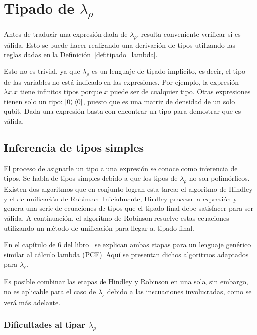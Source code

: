 \chapter{\texorpdfstring{Tipado de $\lambda_\rho$}{Tipado de Lambda Rho}}\label{ch:tipado}

Antes de traducir una expresión dada de $\lambda_\rho$, resulta conveniente verificar si es válida. Esto se puede hacer realizando una derivación de tipos utilizando las reglas dadas en la Definición~\ref{def:tipado_lambda}.

Esto no es trivial, ya que $\lambda_\rho$ es un lenguaje de tipado implícito, es decir, el tipo de las variables no está indicado en las expresiones. Por ejemplo, la expresión $\lambda x.x$ tiene infinitos tipos porque $x$ puede ser de cualquier tipo. Otras expresiones tienen solo un tipo: $\ket{0}\bra{0}$, puesto que es una matriz de densidad de un solo qubit. Dada una expresión basta con encontrar un tipo para demostrar que es válida.

\section{Inferencia de tipos simples}

El proceso de asignarle un tipo a una expresión se conoce como inferencia de tipos. Se habla de tipos simples debido a que los tipos de $\lambda_\rho$ no son polimórficos. Existen dos algoritmos que en conjunto logran esta tarea: el algoritmo de Hindley y el de unificación de Robinson. Inicialmente, Hindley procesa la expresión y genera una serie de ecuaciones de tipos que el tipado final debe satisfacer para ser válida. A continuación, el algoritmo de Robinson resuelve estas ecuaciones utilizando un método de unificación para llegar al tipado final.

En el capítulo de 6 del libro~\cite{intro_programming_languages} se explican ambas etapas para un lenguaje genérico similar al cálculo lambda (PCF). Aquí se presentan dichos algoritmos adaptados para $\lambda_\rho$.

\begin{observacion}
Es posible combinar las etapas de Hindley y Robinson en una sola, sin embargo, no es aplicable para el caso de $\lambda_\rho$ debido a las inecuaciones involucradas, como se verá más adelante.
\end{observacion}

\subsection{\texorpdfstring{Dificultades al tipar $\lambda_\rho$}{Dificultades al tipar Lambda Rho}}

